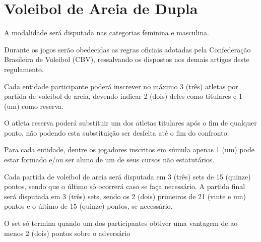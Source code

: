 {\let\clearpage\relax \chapter{Voleibol de Areia de Dupla}}

\begin{article}
	A modalidade será disputada nas categorias feminina e masculina.
\end{article}

\begin{article}
	Durante os jogos serão obedecidas as regras oficiais adotadas pela Confederação Brasileira de Voleibol (CBV), ressalvando os dispostos nos demais artigos deste regulamento.
\end{article}

\begin{article}
	Cada entidade participante poderá inscrever no máximo 3 (três) atletas por partida de voleibol de areia, devendo indicar 2 (dois) deles como titulares e 1 (um) como reserva.

	\begin{xparagraph}
		O atleta reserva poderá substituir um dos atletas titulares após o fim de qualquer ponto, não podendo esta substituição ser desfeita até o fim do confronto.
	\end{xparagraph}

	\begin{xparagraph}
	    Para cada entidade, dentre os jogadores inscritos em súmula apenas 1 (um) pode estar formado e/ou ser aluno de um de seus cursos não estatutários.
	\end{xparagraph}
\end{article}

\begin{article}
	Cada partida de voleibol de areia será disputada em 3 (três) sets de 15 (quinze) pontos, sendo que o último só ocorrerá caso se faça necessário. A partida final será disputada em 3 (três) sets, sendo os 2 (dois) primeiros de 21 (vinte e um) pontos e o último de 15 (quinze) pontos, se necessário.

	\begin{xparagraph}
		O set só termina quando um dos participantes obtiver uma vantagem de ao menos 2 (dois) pontos sobre o adversário
	\end{xparagraph}
\end{article}
